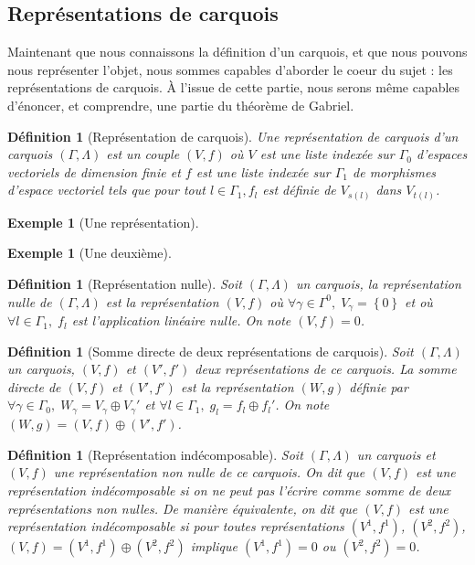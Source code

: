 \documentclass[a4paper,10pt]{article}
\newtheorem{defi}[thm]{Définition}%
\newtheorem{ex}[thm]{Exemple}%
\begin{document}
\subsection{Représentations de carquois}
Maintenant que nous connaissons la définition d'un carquois, et que nous pouvons nous représenter l'objet, nous sommes capables d'aborder le coeur du sujet : les représentations de carquois. À l'issue de cette partie, nous serons même capables d'énoncer, et comprendre, une partie du théorème de Gabriel.
\begin{defi}[Représentation de carquois]
	Une \emph{représentation de carquois} d'un carquois $(\Gamma,\Lambda)$ est un couple $(V,f)$ où $V$ est une liste indexée sur $\Gamma_0$ d'espaces vectoriels de dimension finie et $f$ est une liste indexée sur $\Gamma_1$ de morphismes d'espace vectoriel tels que pour tout $l \in \Gamma_1, f_l$ est définie de $V_{s(l)}$ dans $V_{t(l)}$.
\end{defi}
\begin{ex}[Une représentation]
\end{ex}
\begin{ex}[Une deuxième]
\end{ex}
\begin{defi}[Représentation nulle]
	Soit $(\Gamma,\Lambda)$ un carquois, la \emph{représentation nulle} de $(\Gamma,\Lambda)$ est la représentation $(V,f)$ où $\forall\gamma\in\Gamma^{0},\;V_{\gamma}=\left\{ 0 \right\}$ et où $\forall l \in\Gamma_{1},\;f_{l}$ est l'application linéaire nulle. On note $(V,f)=0$.
\end{defi}
\begin{defi}[Somme directe de deux représentations de carquois]
	Soit $(\Gamma,\Lambda)$ un carquois, $(V,f)$ et $(V',f')$ deux représentations de ce carquois. La \emph{somme directe} de $(V,f)$ et $(V',f')$ est la représentation $(W,g)$ définie par $\forall\gamma\in\Gamma_{0},\;W_{\gamma}=V_{\gamma}\oplus V_{\gamma}'$ et $\forall l \in\Gamma_{1},\;g_{l}=f_{l}\oplus f_{l}'$. On note $(W,g)=(V,f)\oplus (V',f')$.
\end{defi}
\begin{defi}[Représentation indécomposable]
	Soit $(\Gamma,\Lambda)$ un carquois et $(V,f)$ une représentation non nulle de ce carquois. On dit que $(V,f)$ est une \emph{représentation indécomposable} si on ne peut pas l'écrire comme somme de deux représentations non nulles. De manière équivalente, on dit que $(V,f)$ est une représentation indécomposable si pour toutes représentations $(V^{1},f^{1})$, $(V^{2},f^{2})$, $(V,f)=(V^{1},f^{1})\oplus(V^{2},f^{2})$ implique $(V^{1},f^{1})=0$ ou $(V^{2},f^{2})=0$.
\end{defi}
\end{document}
